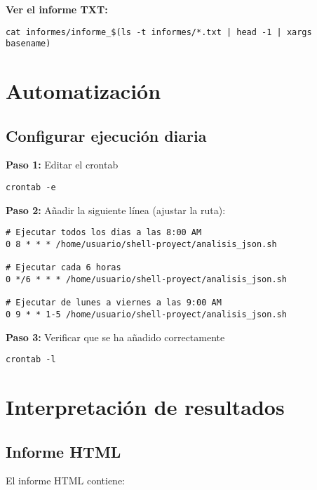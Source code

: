 \textbf{Ver el informe TXT:}
\begin{lstlisting}[style=bash]
cat informes/informe_$(ls -t informes/*.txt | head -1 | xargs basename)
\end{lstlisting}

\section{Automatización}

\subsection{Configurar ejecución diaria}

\textbf{Paso 1:} Editar el crontab
\begin{lstlisting}[style=bash]
crontab -e
\end{lstlisting}

\textbf{Paso 2:} Añadir la siguiente línea (ajustar la ruta):
\begin{lstlisting}[style=bash]
# Ejecutar todos los dias a las 8:00 AM
0 8 * * * /home/usuario/shell-proyect/analisis_json.sh

# Ejecutar cada 6 horas
0 */6 * * * /home/usuario/shell-proyect/analisis_json.sh

# Ejecutar de lunes a viernes a las 9:00 AM
0 9 * * 1-5 /home/usuario/shell-proyect/analisis_json.sh
\end{lstlisting}

\textbf{Paso 3:} Verificar que se ha añadido correctamente
\begin{lstlisting}[style=bash]
crontab -l
\end{lstlisting}

\section{Interpretación de resultados}

\subsection{Informe HTML}

El informe HTML contiene:

